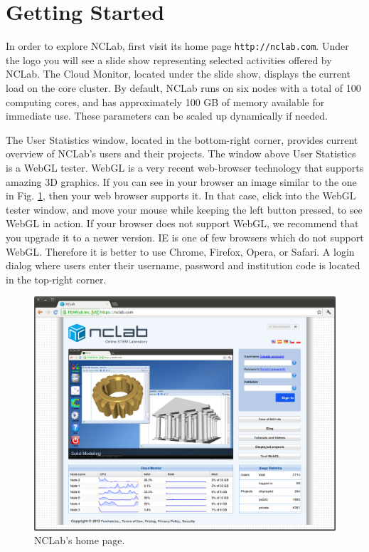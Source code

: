 \documentclass[article,A4,12pt]{llncs}
\begin{document}
\newpage

\section{Getting Started}

In order to explore NCLab, first visit its home page {\tt http://nclab.com}.
Under the logo you will see a slide show representing selected activities 
offered by NCLab. The Cloud Monitor, located under the slide show, displays 
the current load on the core cluster. By default, NCLab runs on six nodes 
with a total of 100 computing cores, and has approximately 100 GB of memory 
available for immediate use. These parameters can be scaled up dynamically 
if needed. 

The User Statistics window, located in the 
bottom-right corner, provides current overview of NCLab's users and their projects. 
The window above User Statistics is a WebGL tester. WebGL is a very recent 
web-browser technology that supports amazing 3D graphics. If you can see in your 
browser an image similar to the one in Fig. \ref{fig:outside}, then your web 
browser supports it. In that case, click into the WebGL tester window, and move 
your mouse while keeping the left button pressed, to see WebGL in action.
If your browser does not support WebGL, we recommend that you 
upgrade it to a newer version. IE is one of few browsers which do not support WebGL. Therefore 
it is better to use Chrome, Firefox, Opera, or Safari. A login dialog where
users enter their username, password and institution code is located in the 
top-right corner.\\[-8mm]

\begin{figure}[!ht]
\begin{center}
\includegraphics[width=\textwidth]{img/outside.png}
\end{center}
\vspace{-2mm}
\caption{NCLab's home page.}
\label{fig:outside}
\vspace{-0.6cm}
\end{figure}
\end{document}
